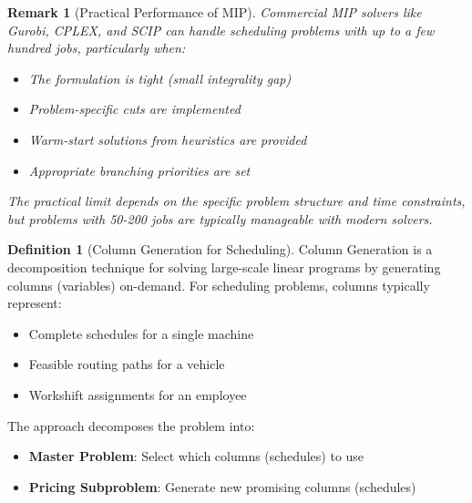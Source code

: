 \documentclass{article}
\newtheorem{remark}{Remark}
\theoremstyle{definition}
\newtheorem{definition}{Definition}
\begin{document}
\begin{remark}[Practical Performance of MIP]
Commercial MIP solvers like Gurobi, CPLEX, and SCIP can handle scheduling problems with up to a few hundred jobs, particularly when:
\begin{itemize}
    \item The formulation is tight (small integrality gap)
    \item Problem-specific cuts are implemented
    \item Warm-start solutions from heuristics are provided
    \item Appropriate branching priorities are set
\end{itemize}
The practical limit depends on the specific problem structure and time constraints, but problems with 50-200 jobs are typically manageable with modern solvers.
\end{remark}

\begin{definition}[Column Generation for Scheduling]
Column Generation is a decomposition technique for solving large-scale linear programs by generating columns (variables) on-demand. For scheduling problems, columns typically represent:
\begin{itemize}
    \item Complete schedules for a single machine
    \item Feasible routing paths for a vehicle
    \item Workshift assignments for an employee
\end{itemize}

The approach decomposes the problem into:
\begin{itemize}
    \item \textbf{Master Problem}: Select which columns (schedules) to use
    \item \textbf{Pricing Subproblem}: Generate new promising columns (schedules)
\end{itemize}
\end{definition}
\end{document}
